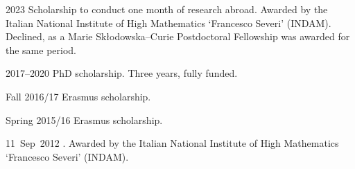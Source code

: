 \chronorow
  {2023}
  {Scholarship to conduct one month of research abroad.}
  {Awarded by the Italian National Institute of High Mathematics `Francesco Severi' (INDAM). Declined, as a
   Marie Skłodowska--Curie Postdoctoral Fellowship was awarded for the same period.}

\chronorow
  {2017--2020}
  {PhD scholarship.}
  {Three years, fully funded.}

\chronorow
  {Fall 2016/17}
  {Erasmus scholarship.}
  {}

\chronorow
  {Spring 2015/16}
  {Erasmus scholarship.}
  {}

\chronorow
  {11~Sep~2012}
  {.}
  {Awarded by the Italian National Institute of High Mathematics `Francesco Severi' (INDAM).}
